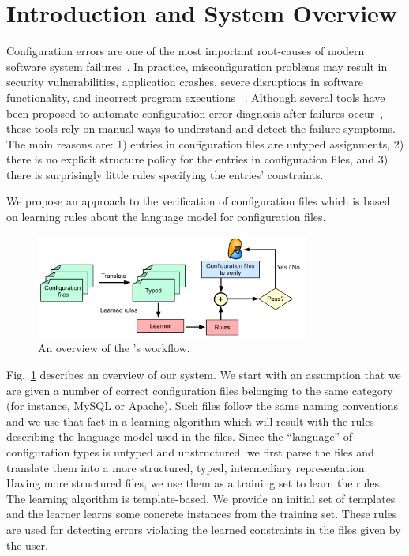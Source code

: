 \section{Introduction and System Overview}
\label{sec:Intro}

Configuration errors are one of the most important root-causes of
modern software system failures~\cite{xu15systems,yin11anempirical}.
In practice, misconfiguration problems may result in security
vulnerabilities, application crashes, severe disruptions in software
functionality, and incorrect program executions%
~\cite{xu15systems,zhang14encore,yuan11context}.  Although several
tools have been proposed to automate configuration error diagnosis
after failures occur~\cite{wang04automatic,attariyan10automating,
su07autobash,whitaker04configuration}, these tools rely on manual ways
  to understand and detect the failure symptoms. The main reasons are:
  1) entries in configuration files are untyped assignments, 2) there
  is no explicit structure policy for the entries in configuration
  files, and 3) there is surprisingly little rules specifying the
  entries' constraints.

We propose an approach to the verification of  
configuration files which is based on learning rules about the language 
model for configuration files. 

\begin{figure}[t] \centering
\includegraphics[width=0.8\textwidth]{figs/overview}
\caption{An overview of the \app's workflow.}
\label{fig-overview}
\end{figure}

Fig.~\ref{fig-overview} describes an overview of our system. We start
with an assumption that we are given a number of correct configuration
files belonging to the same category (for instance, MySQL or
Apache). Such files follow the same naming conventions and we use that
fact in a learning algorithm which will result with the rules
describing the language model used in the files. Since the
``language'' of configuration types is untyped and unstructured, we
first parse the files and translate them into a more structured,
typed, intermediary representation. Having more structured files, we
use them as a training set to learn the rules. The learning algorithm
is template-based. We provide an initial set of templates and the
learner learns some concrete instances from the training set. These
rules are used for detecting errors violating the learned constraints
in the files given by the user.

